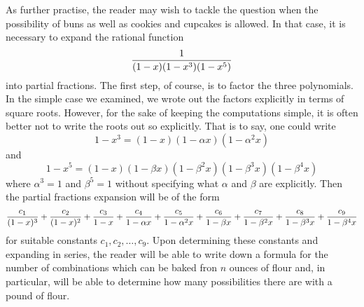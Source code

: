\documentclass[12pt]{article}
\begin{document}
As further practise, the reader may wish to tackle the question when the possibility of buns as well as cookies and cupcakes is allowed.  In that case, it is necessary to expand the rational function
 $${1 \over (1 - x) (1 - x^3) (1 - x^5)}$$
into partial fractions.  The first step, of course, is to factor the three polynomials.  In the simple case we examined, we wrote out the factors explicitly in terms of square roots.  However, for the sake of keeping the computations simple, it is often better not to write the roots out so explicitly.  That is to say, one could write
 $$1 - x^3 = (1 - x) (1 - \alpha x) (1 - \alpha^2 x)$$
and
 $$1 - x^5 = (1 - x) (1 - \beta x) (1 - \beta^2 x) (1 - \beta^3 x) (1 - \beta^4 x)$$
where $\alpha^3 = 1$ and $\beta^5 = 1$ without specifying what $\alpha$ and $\beta$ are explicitly.
 Then the partial fractions expansion will be of the form
 $${c_1 \over (1 - x)^3} + {c_2 \over (1 - x)^2} + {c_3 \over 1 - x} + {c_4 \over 1 - \alpha x} + {c_5 \over 1 - \alpha^2 x} + {c_6 \over 1 - \beta x} + {c_7 \over 1 - \beta^2 x} + {c_8 \over 1 - \beta^3 x} + {c_9 \over 1 - \beta^4 x}$$
for suitable constants $c_1, c_2, \ldots, c_9$.  Upon determining these constants and expanding in series, the reader will be able to write down a formula for the number of combinations which can be baked fron $n$ ounces of flour and, in particular, will be able to determine how many possibilities there are with a pound of flour.
\end{document}
